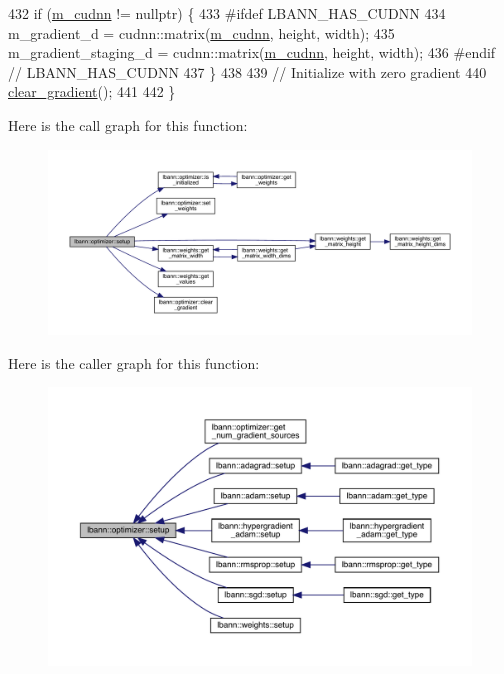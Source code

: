 \begin{DoxyCode}
432   \textcolor{keywordflow}{if} (\hyperlink{classlbann_1_1optimizer_a2f24dbeaca18b06f4aa7d179bbf96680}{m\_cudnn} != \textcolor{keyword}{nullptr}) \{
433 \textcolor{preprocessor}{#ifdef LBANN\_HAS\_CUDNN}
434     m\_gradient\_d = cudnn::matrix(\hyperlink{classlbann_1_1optimizer_a2f24dbeaca18b06f4aa7d179bbf96680}{m\_cudnn}, height, width);
435     m\_gradient\_staging\_d = cudnn::matrix(\hyperlink{classlbann_1_1optimizer_a2f24dbeaca18b06f4aa7d179bbf96680}{m\_cudnn}, height, width);
436 \textcolor{preprocessor}{#endif // LBANN\_HAS\_CUDNN}
437   \}
438 
439   \textcolor{comment}{// Initialize with zero gradient}
440   \hyperlink{classlbann_1_1optimizer_a3f41360479fbd46c704342bb4ef36d09}{clear\_gradient}();
441 
442 \}
\end{DoxyCode}
Here is the call graph for this function\+:\nopagebreak
\begin{figure}[H]
\begin{center}
\leavevmode
\includegraphics[width=350pt]{classlbann_1_1optimizer_a7641a88b3c166df2d974a298622b992b_cgraph}
\end{center}
\end{figure}
Here is the caller graph for this function\+:\nopagebreak
\begin{figure}[H]
\begin{center}
\leavevmode
\includegraphics[width=350pt]{classlbann_1_1optimizer_a7641a88b3c166df2d974a298622b992b_icgraph}
\end{center}
\end{figure}
\mbox{\label{classlbann_1_1optimizer_a1fe495ccbd62d50735615818abecf454}} 

